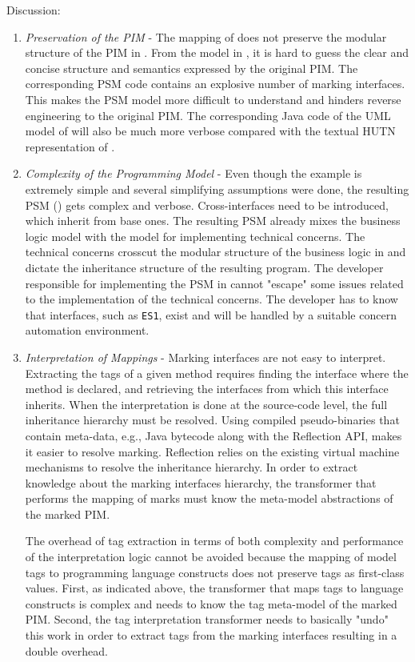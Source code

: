 \noindent Discussion:
\begin{enumerate}
\item \textit{Preservation of the PIM} - The mapping of  does not preserve the modular structure of the PIM in . From the model in , it is hard to guess the clear and concise structure and semantics expressed by the original PIM. The corresponding PSM code contains an explosive number of marking interfaces. This makes the PSM model more difficult to understand and hinders reverse engineering to the original PIM. The corresponding Java code of the UML model of  will also be much more verbose compared with the textual HUTN representation of . 

\item \textit{Complexity of the Programming Model} - Even though the example is extremely simple and several simplifying assumptions were done, the resulting PSM () gets complex and verbose. Cross-interfaces need to be introduced, which inherit from base ones. The resulting PSM already mixes the business logic model with the model for implementing technical concerns. The technical concerns crosscut the modular structure of the business logic in  and dictate the inheritance structure of the resulting program. The developer responsible for implementing the PSM in  cannot "escape" some issues related to the implementation of the technical concerns. The developer has to know that interfaces, such as {\tt ES1}, exist and will be handled by a suitable concern automation environment.

\item \textit{Interpretation of Mappings} - Marking interfaces are not easy to interpret. Extracting the tags of a given method requires finding the interface where the method is declared, and retrieving the interfaces from which this interface inherits. When the interpretation is done at the source-code level, the full inheritance hierarchy must be resolved. Using compiled pseudo-binaries that contain meta-data, e.g., Java bytecode along with the Reflection API, makes it easier to resolve marking. Reflection relies on the existing virtual machine mechanisms to resolve the inheritance hierarchy. In order to extract knowledge about the marking interfaces hierarchy, the transformer that performs the mapping of marks must know the meta-model abstractions of the marked PIM. 

The overhead of tag extraction in terms of both complexity and performance of the interpretation logic cannot be avoided because the mapping of model tags to programming language constructs does not preserve tags as first-class values. First, as indicated above, the transformer that maps tags to language constructs is complex and needs to know the tag meta-model of the marked PIM. Second, the tag interpretation transformer needs to basically "undo" this work in order to extract tags from the marking interfaces resulting in a double overhead.


\end{enumerate}
